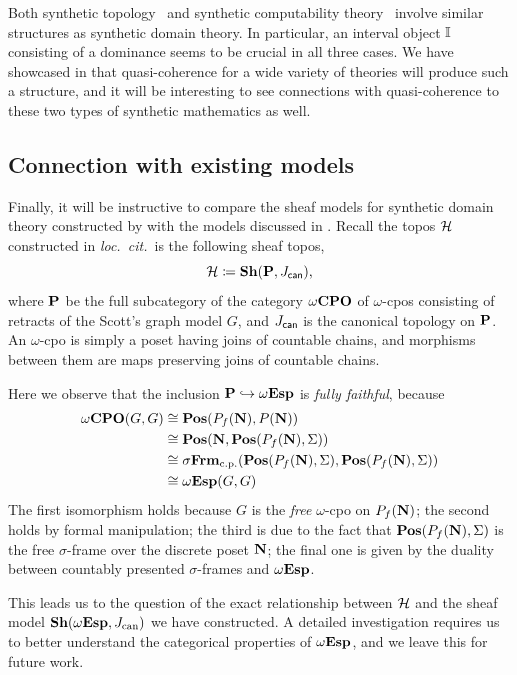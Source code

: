 Both synthetic topology~\citep{bauer2009dedekind} and synthetic computability theory~\citep{RN552} involve similar structures as synthetic domain theory. In particular, an interval object $\mathbb{I}$ consisting of a dominance seems to be crucial in all three cases. We have showcased in  that quasi-coherence for a wide variety of theories will produce such a structure, and it will be interesting to see connections with quasi-coherence to these two types of synthetic mathematics as well.

\subsection{Connection with existing models}\label{subsec:compare}

Finally, it will be instructive to compare the sheaf models for synthetic domain theory constructed by \citet{FIORE1997151} with the models discussed in . Recall the topos $\mathcal{H}$ constructed in \emph{loc.\ cit.}\ is the following sheaf topos,
\[ \mc H \coloneq \sh(\mb P,J_{\ms{can}})\text{,} \]
where $\mathbf{P}$ be the full subcategory of the category $\omega\mathbf{CPO}$ of $\omega$-cpos consisting of retracts of the Scott's graph model $G$, and $J_{\mathsf{can}}$ is the canonical topology on $\mathbf{P}$. An $\omega$-cpo is simply a poset having joins of countable chains, and morphisms between them are maps preserving joins of countable chains.

Here we observe that the inclusion $\mathbf{P} \hookrightarrow \omega\mathbf{Esp}$ is \emph{fully faithful}, because
\begin{align*}
  \omega\mathbf{CPO}(G,G)
  &\cong \mathbf{Pos}(P_f(\mathbf{N}),P(\mathbf{N})) \\
  &\cong \mathbf{Pos}(\mathbf{N},\mathbf{Pos}(P_f(\mathbf{N}),\Sigma)) \\
  &\cong \sigma\mathbf{Frm}_{\mathrm{c.p.}}(\mathbf{Pos}(P_f(\mathbf{N}),\Sigma),\mathbf{Pos}(P_f(\mathbf{N}),\Sigma)) \\ 
  &\cong \omega\mathbf{Esp}(G,G)
\end{align*}
The first isomorphism holds because $G$ is the \emph{free} $\omega$-cpo on $P_f(\mathbf{N})$; the second holds by formal manipulation; the third is due to the fact that $\mathbf{Pos}(P_f(\mathbf{N}),\Sigma)$ is the free $\sigma$-frame over the discrete poset $\mathbf{N}$; the final one is given by the duality between countably presented $\sigma$-frames and $\omega\mathbf{Esp}$. 

This leads us to the question of the exact relationship between $\mathcal{H}$ and the sheaf model $\mathbf{Sh}(\omega\mathbf{Esp},J_{\mathrm{can}})$ we have constructed. A detailed investigation requires us to better understand the categorical properties of $\omega\mathbf{Esp}$, and we leave this for future work.


